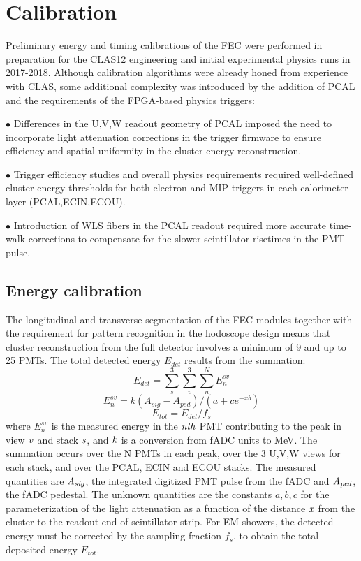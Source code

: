 \section{Calibration} \label{Calibration}

Preliminary energy and timing calibrations of the FEC were performed in preparation for the CLAS12 engineering and initial experimental physics runs in 2017-2018.  Although calibration algorithms were already honed from experience with CLAS, some additional complexity was introduced by the addition of PCAL and the requirements of the FPGA-based physics triggers: 

$\bullet$ Differences in the U,V,W readout geometry of PCAL imposed the need to incorporate light attenuation corrections in the trigger firmware to ensure efficiency and spatial uniformity in the cluster energy reconstruction.

$\bullet$ Trigger efficiency studies and overall physics requirements required well-defined cluster energy thresholds for both electron and MIP triggers in each calorimeter layer (PCAL,ECIN,ECOU).

$\bullet$ Introduction of WLS fibers in the PCAL readout required more accurate time-walk corrections to compensate for the slower scintillator risetimes in the PMT pulse.

\subsection{Energy calibration}
The longitudinal and transverse segmentation of the FEC modules together with the requirement for pattern recognition in the hodoscope design means that cluster reconstruction from the full detector involves a minimum of 9 and up to 25 PMTs.  The total detected energy $E_{det}$ results from the summation:
\begin{equation}
 E_{det} = \sum_{s}^{3} \sum_{v}^{3} \sum_{n}^{N} E_{n}^{sv}\label{eq:E1}
\end{equation}
\begin{equation}
 E_{n}^{sv} = k(A_{sig}-A_{ped})/(a+c e^{-xb})   \label{eq:E2}
\end{equation}
\begin{equation}
 E_{tot} = E_{det}/f_{s}                 \label{eq:E3}
\end{equation}
where $E_{n}^{sv}$ is the measured energy in the $\it{nth}$ PMT contributing to the peak 
in view $\it{v}$ and stack $\it{s}$, and $\it{k}$ is a conversion from fADC units to MeV.  The summation occurs over the N PMTs in each peak, over the 3 U,V,W views for each stack, and over the PCAL, ECIN and ECOU stacks.  The measured quantities are $\it{A_{sig}}$, the integrated digitized PMT pulse from the fADC and $\it{A_{ped}}$, the fADC pedestal.  The unknown quantities are the constants $a,b,c$ for the parameterization of the light attenuation as a function of the distance $\it{x}$ from the cluster to the readout end of scintillator strip. For EM showers, the detected energy must be corrected by the sampling fraction $f_{s}$, to obtain the total deposited energy $E_{tot}$.  

